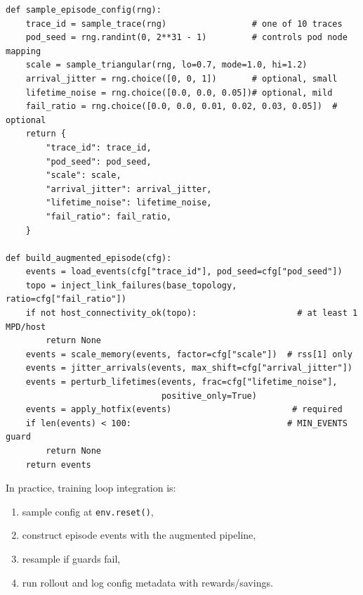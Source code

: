 \documentclass[11pt]{article}
\begin{document}
\begin{verbatim}
def sample_episode_config(rng):
    trace_id = sample_trace(rng)                 # one of 10 traces
    pod_seed = rng.randint(0, 2**31 - 1)         # controls pod node mapping
    scale = sample_triangular(rng, lo=0.7, mode=1.0, hi=1.2)
    arrival_jitter = rng.choice([0, 0, 1])       # optional, small
    lifetime_noise = rng.choice([0.0, 0.0, 0.05])# optional, mild
    fail_ratio = rng.choice([0.0, 0.0, 0.01, 0.02, 0.03, 0.05])  # optional
    return {
        "trace_id": trace_id,
        "pod_seed": pod_seed,
        "scale": scale,
        "arrival_jitter": arrival_jitter,
        "lifetime_noise": lifetime_noise,
        "fail_ratio": fail_ratio,
    }

def build_augmented_episode(cfg):
    events = load_events(cfg["trace_id"], pod_seed=cfg["pod_seed"])
    topo = inject_link_failures(base_topology, ratio=cfg["fail_ratio"])
    if not host_connectivity_ok(topo):                    # at least 1 MPD/host
        return None
    events = scale_memory(events, factor=cfg["scale"])  # rss[1] only
    events = jitter_arrivals(events, max_shift=cfg["arrival_jitter"])
    events = perturb_lifetimes(events, frac=cfg["lifetime_noise"],
                               positive_only=True)
    events = apply_hotfix(events)                        # required
    if len(events) < 100:                               # MIN_EVENTS guard
        return None
    return events
\end{verbatim}

In practice, training loop integration is:
\begin{enumerate}
  \item sample config at \texttt{env.reset()},
  \item construct episode events with the augmented pipeline,
  \item resample if guards fail,
  \item run rollout and log config metadata with rewards/savings.
\end{enumerate}
\end{document}
